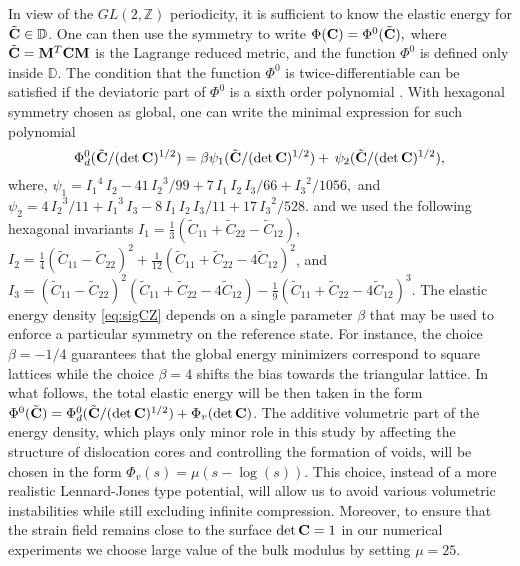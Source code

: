 \documentclass[CRPHYS,Unicode,manuscript]{cedram}
\begin{document}
In view of the  $GL(2,\mathbb Z)$  periodicity,  it is sufficient  to know the elastic energy for $ \tilde{\bold C} \in \mathbb D$.  
%
One can then use the symmetry to write   $\Phi(\bold C) =\Phi^0 ( \tilde{\bf C}), $ where  $\tilde{\bf C}=\bold M^T\bold C\bold M$  is  the Lagrange reduced metric,  and   the function $\Phi^0$  is defined only inside $\mathbb D$. 
The    condition that the function $\Phi^0$  is twice-differentiable can be satisfied if  the deviatoric part of  $\Phi^0$ is a sixth order polynomial \cite{Parry1976-zt, Parry1998-sv}.  With  hexagonal symmetry chosen as global, one  can write   the minimal  expression for such polynomial \cite{Conti2004-sv} 
\begin{equation}
\Phi^0_{d}(\tilde{\bf C}/(\det  {\bf C})^{1/2}) =\beta\psi_1(\tilde{\bf C}/(\det  {\bf C})^{1/2})+ \,\psi_2(\tilde{\bf C}/(\det  {\bf C})^{1/2}),
\label{eq:sigCZ}
\end{equation}
where, $
\psi_1={I_1}^4\,I_2 - 41\,{I_2}^3/99 +
7\,I_1\,I_2\,I_3/66 + {I_3}^2/1056, $ and $
\psi_2 = 4\,{I_2}^3/11  + {I_1}^3\,I_3 -  8\,I_1\,I_2\,I_3/11  +  17\,{I_3}^2/528. 
$
and  we used  the following hexagonal invariants  
$
I_1 =  \frac{1}{3} (\tilde{C}_{11} + \tilde{C}_{22} - \tilde{C}_{12})$, 
$I_2= \frac{1}{4} (\tilde{C}_{11} - \tilde{C}_{22})^2 + \frac{1}{12}(\tilde{C}_{11} + \tilde{C}_{22} -
4 \tilde{C}_{12})^2$, and 
$I_3 =  (\tilde{C}_{11} - \tilde{C}_{22})^2 (\tilde{C}_{11} + \tilde{C}_{22} - 4 \tilde{C}_{12}) - \frac{1}{9} (\tilde{C}_{11} + \tilde{C}_{22} -
4 \tilde{C}_{12})^3$. 
The elastic energy density \eqref{eq:sigCZ}  depends on a  single    parameter $\beta$ that may be used to enforce  a particular  symmetry on the reference state. For instance,  the choice   $\beta=-1/4$  guarantees that  the  global  energy minimizers  correspond to  square  lattices while the choice $\beta=4$ shifts the  bias towards the triangular lattice.  In what follows, the total elastic energy will be then taken in the form $ \Phi^0( \tilde {\bf C}) =  \Phi^0_d(\tilde{\bf C}/(\det  {\bf C})^{1/2})+\Phi_v(\det  {\bf C})$.  The   additive volumetric part of the energy density, which   plays only minor role in this study by affecting the structure of dislocation cores and controlling the formation of voids, %
 will  be chosen in the  form  $\Phi_v(s)=\mu  (s-\log(s))$. This choice, instead of a more realistic Lennard-Jones type potential, will allow us to  avoid  various  volumetric instabilities  while still excluding infinite  compression. Moreover,  to ensure  that the strain field  remains  close to the surface $\det \bold C = 1$ in our numerical experiments we choose large value of the bulk modulus by setting $\mu=25$.
 
\end{document}
